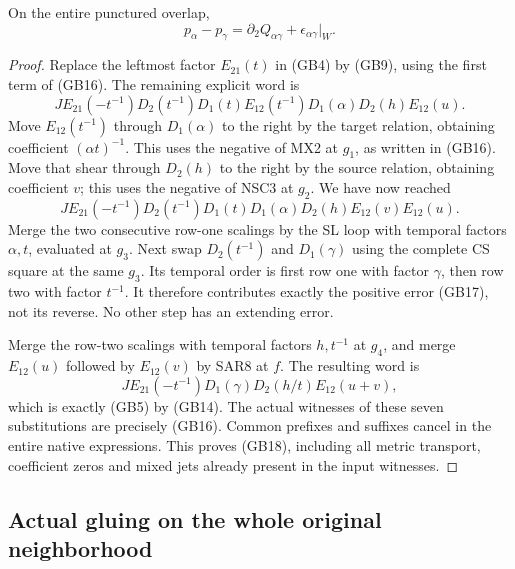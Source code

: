 \begin{lemma}
On the entire punctured overlap,
\[
          p_\alpha-p_\gamma
                =\partial_2Q_{\alpha\gamma}
                           +\epsilon_{\alpha\gamma}|_W.
 \tag{GB18}
\]
\end{lemma}

\begin{proof}
Replace the leftmost factor $E_{21}(t)$ in (GB4) by (GB9),
using the first term of (GB16).  The remaining explicit word is
\[
 J E_{21}(-t^{-1})D_2(t^{-1})D_1(t)
                   E_{12}(t^{-1})D_1(\alpha)D_2(h)E_{12}(u).
 \tag{GB19}
\]
Move $E_{12}(t^{-1})$ through $D_1(\alpha)$ to the right by
the target relation, obtaining coefficient $(\alpha t)^{-1}$.
This uses the negative of MX2 at $g_1$, as written in (GB16).
Move that shear through $D_2(h)$ to the right by the source
relation, obtaining coefficient $v$; this uses the negative
of NSC3 at $g_2$.  We have now reached
\[
 J E_{21}(-t^{-1})D_2(t^{-1})D_1(t)D_1(\alpha)D_2(h)
                                       E_{12}(v)E_{12}(u).
 \tag{GB20}
\]
Merge the two consecutive row-one scalings by the SL loop with
temporal factors $\alpha,t$, evaluated at $g_3$.  Next swap
$D_2(t^{-1})$ and $D_1(\gamma)$ using the complete CS square
at the same $g_3$.  Its temporal order is first row one with
factor $\gamma$, then row two with factor $t^{-1}$.  It therefore
contributes exactly the positive error (GB17), not its reverse.
No other step has an extending error.

Merge the row-two scalings with temporal factors $h,t^{-1}$
at $g_4$, and merge $E_{12}(u)$ followed by $E_{12}(v)$ by
SAR8 at $f$.  The resulting word is
\[
 J E_{21}(-t^{-1})D_1(\gamma)D_2(h/t)E_{12}(u+v),
 \tag{GB21}
\]
which is exactly (GB5) by (GB14).  The actual witnesses of
these seven substitutions are precisely (GB16).  Common
prefixes and suffixes cancel in the entire native expressions.
This proves (GB18), including all metric transport, coefficient
zeros and mixed jets already present in the input witnesses.
\end{proof}

\subsection{Actual gluing on the whole original neighborhood}

